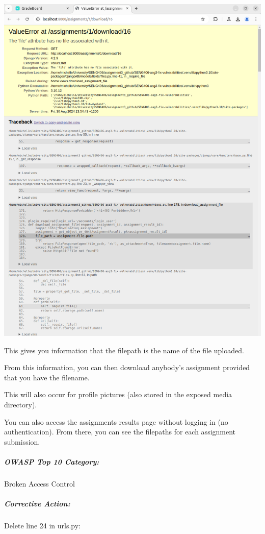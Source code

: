 \begin{center}
    \includegraphics[width = \linewidth]{images/Michelle/filefinding.png}
\end{center}

This gives you information that the filepath is the name of the file uploaded.

From this information, you can then download anybody's assignment provided that you have the filename.

This will also occur for profile pictures (also stored in the exposed media directory).

You can also access the assignments results page without logging in (no authentication). From there, you can see the filepaths for each assignment submission.

\subparagraph{OWASP Top 10 Category:}

Broken Access Control

\subparagraph{Corrective Action:}

Delete line 24 in urls.py:

